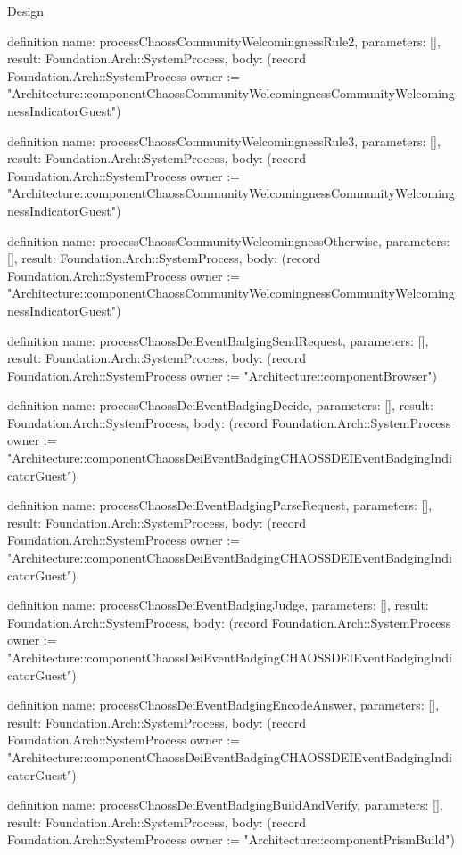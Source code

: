\begin{lexlean}{Design}
\begin{semanticmodule}
definition{
  name: processChaossCommunityWelcomingnessRule2,
  parameters: [],
  result: Foundation.Arch::SystemProcess,
  body: (record Foundation.Arch::SystemProcess {owner := "Architecture::componentChaossCommunityWelcomingnessCommunityWelcomingnessIndicatorGuest"})
}

definition{
  name: processChaossCommunityWelcomingnessRule3,
  parameters: [],
  result: Foundation.Arch::SystemProcess,
  body: (record Foundation.Arch::SystemProcess {owner := "Architecture::componentChaossCommunityWelcomingnessCommunityWelcomingnessIndicatorGuest"})
}

definition{
  name: processChaossCommunityWelcomingnessOtherwise,
  parameters: [],
  result: Foundation.Arch::SystemProcess,
  body: (record Foundation.Arch::SystemProcess {owner := "Architecture::componentChaossCommunityWelcomingnessCommunityWelcomingnessIndicatorGuest"})
}

definition{
  name: processChaossDeiEventBadgingSendRequest,
  parameters: [],
  result: Foundation.Arch::SystemProcess,
  body: (record Foundation.Arch::SystemProcess {owner := "Architecture::componentBrowser"})
}

definition{
  name: processChaossDeiEventBadgingDecide,
  parameters: [],
  result: Foundation.Arch::SystemProcess,
  body: (record Foundation.Arch::SystemProcess {owner := "Architecture::componentChaossDeiEventBadgingCHAOSSDEIEventBadgingIndicatorGuest"})
}

definition{
  name: processChaossDeiEventBadgingParseRequest,
  parameters: [],
  result: Foundation.Arch::SystemProcess,
  body: (record Foundation.Arch::SystemProcess {owner := "Architecture::componentChaossDeiEventBadgingCHAOSSDEIEventBadgingIndicatorGuest"})
}

definition{
  name: processChaossDeiEventBadgingJudge,
  parameters: [],
  result: Foundation.Arch::SystemProcess,
  body: (record Foundation.Arch::SystemProcess {owner := "Architecture::componentChaossDeiEventBadgingCHAOSSDEIEventBadgingIndicatorGuest"})
}

definition{
  name: processChaossDeiEventBadgingEncodeAnswer,
  parameters: [],
  result: Foundation.Arch::SystemProcess,
  body: (record Foundation.Arch::SystemProcess {owner := "Architecture::componentChaossDeiEventBadgingCHAOSSDEIEventBadgingIndicatorGuest"})
}

definition{
  name: processChaossDeiEventBadgingBuildAndVerify,
  parameters: [],
  result: Foundation.Arch::SystemProcess,
  body: (record Foundation.Arch::SystemProcess {owner := "Architecture::componentPrismBuild"})
}


\end{semanticmodule}
\end{lexlean}

